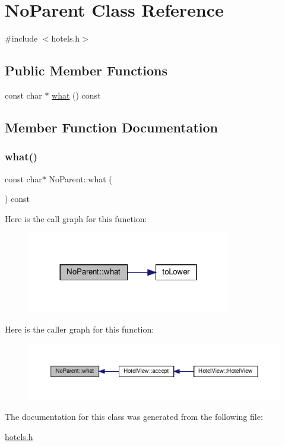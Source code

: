 \hypertarget{class_no_parent}{}\section{No\+Parent Class Reference}
\label{class_no_parent}


{\ttfamily \#include $<$hotels.\+h$>$}

\subsection*{Public Member Functions}
\begin{DoxyCompactItemize}
\item 
const char $\ast$ \hyperlink{class_no_parent_aa61c3448b2c6f4e8586590b96bc6ab85}{what} () const
\end{DoxyCompactItemize}


\subsection{Member Function Documentation}
\mbox{\label{class_no_parent_aa61c3448b2c6f4e8586590b96bc6ab85}} 
\subsubsection{\texorpdfstring{what()}{what()}}
{\footnotesize\ttfamily const char$\ast$ No\+Parent\+::what (\begin{DoxyParamCaption}{ }\end{DoxyParamCaption}) const\hspace{0.3cm}{\ttfamily [inline]}}

Here is the call graph for this function\+:\nopagebreak
\begin{figure}[H]
\begin{center}
\leavevmode
\includegraphics[width=252pt]{class_no_parent_aa61c3448b2c6f4e8586590b96bc6ab85_cgraph}
\end{center}
\end{figure}
Here is the caller graph for this function\+:\nopagebreak
\begin{figure}[H]
\begin{center}
\leavevmode
\includegraphics[width=350pt]{class_no_parent_aa61c3448b2c6f4e8586590b96bc6ab85_icgraph}
\end{center}
\end{figure}


The documentation for this class was generated from the following file\+:\begin{DoxyCompactItemize}
\item 
\hyperlink{hotels_8h}{hotels.\+h}\end{DoxyCompactItemize}
